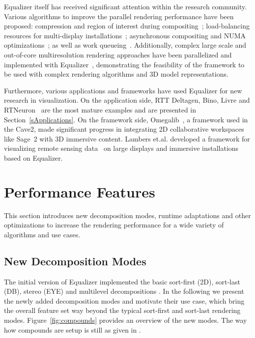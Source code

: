 \documentclass[10pt,journal,compsoc]{IEEEtran}
\newcommand{\sref}[1]{Section~\ref{#1}}
\newcommand{\fig}[1]{Figure~\ref{#1}}
\begin{document}
\textsf{Equalizer} itself has received significant attention within the research
community. Various algorithms to improve the parallel rendering performance have
been proposed: compression and region of interest during
compositing~\cite{MEP:10}; load-balancing resources for multi-display
installations~\cite{EEP:11}; asynchronous compositing and NUMA
optimizations~\cite{EBAHMP:12}; as well as work queueing~\cite{SPEP:16}.
Additionally, complex large scale and out-of-core multiresolution
rendering approaches have been parallelized and implemented with
Equalizer~\cite{GMBP:10, GEMPG:13}, demonstrating the feasibility of
the framework to be used with complex rendering algorithms and 3D model
representations.

Furthermore, various applications and frameworks have used \textsf{Equalizer}
for new research in visualization. On the application side, \textsf{RTT
Deltagen}, \textsf{Bino}, \textsf{Livre} and \textsf{RTNeuron}~\cite{HBBES:13}
are the most mature examples and are presented in \sref{sApplications}. On the
framework side, \textsf{Omegalib}~\cite{Omegalib}, a framework used in the
Cave2, made significant progress in integrating 2D collaborative workspaces like
\textsf{Sage~2} with 3D immersive content. Lambers et.al. developed a framework
for visualizing remote sensing data~\cite{LK:09} on large displays and immersive
installations based on Equalizer.

\section{Performance Features}

This section introduces new decomposition modes, runtime adaptations and other
optimizations to increase the rendering performance for a wide variety of
algorithms and use cases.

\subsection{New Decomposition Modes}

The initial version of \textsf{Equalizer} implemented the basic sort-first (2D),
sort-last (DB), stereo (EYE) and multilevel decompositions \cite{EMP:09}. In the
following we present the newly added decomposition modes and motivate their use
case, which bring the overall feature set way beyond the typical sort-first and
sort-last rendering modes. \fig{fig:compounds} provides an overview of the new
modes. The way how compounds are setup is still as given in \cite{EMP:09}.
\end{document}
